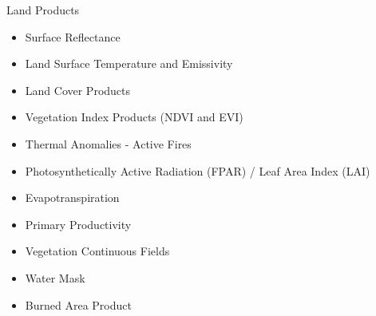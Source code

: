 \documentclass[ignorenonframetext,]{beamer}
\begin{document}
\begin{frame}{Land Products}

\begin{itemize}
\itemsep1pt\parskip0pt
\item
  Surface Reflectance
\item
  Land Surface Temperature and Emissivity
\item
  Land Cover Products
\item
  Vegetation Index Products (NDVI and EVI)
\item
  Thermal Anomalies - Active Fires
\item
  Photosynthetically Active Radiation (FPAR) / Leaf Area Index (LAI)
\item
  Evapotranspiration
\item
  Primary Productivity
\item
  Vegetation Continuous Fields
\item
  Water Mask
\item
  Burned Area Product
\end{itemize}

\end{frame}
\end{document}
